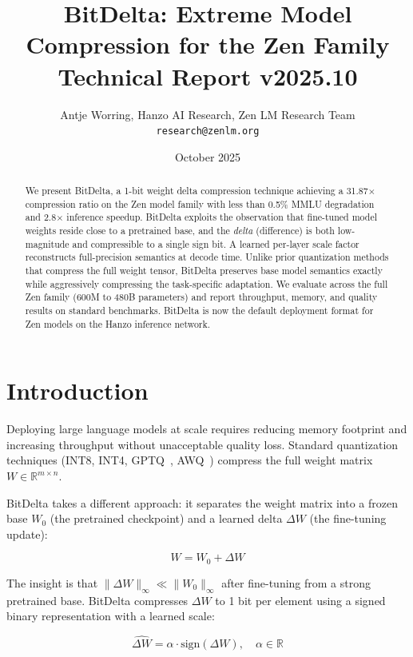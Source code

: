 \documentclass[11pt,a4paper]{article}
\title{\textbf{BitDelta: Extreme Model Compression for the Zen Family}\\
\large Technical Report v2025.10}
\author{Antje Worring, Hanzo AI Research, Zen LM Research Team\\
\texttt{research@zenlm.org}}
\date{October 2025}
\begin{document}
\maketitle

\begin{abstract}
We present BitDelta, a 1-bit weight delta compression technique achieving a 31.87$\times$
compression ratio on the Zen model family with less than 0.5\% MMLU degradation and
2.8$\times$ inference speedup. BitDelta exploits the observation that fine-tuned model
weights reside close to a pretrained base, and the \emph{delta} (difference) is both
low-magnitude and compressible to a single sign bit. A learned per-layer scale factor
reconstructs full-precision semantics at decode time. Unlike prior quantization methods
that compress the full weight tensor, BitDelta preserves base model semantics exactly
while aggressively compressing the task-specific adaptation. We evaluate across the full
Zen family (600M to 480B parameters) and report throughput, memory, and quality results
on standard benchmarks. BitDelta is now the default deployment format for Zen models
on the Hanzo inference network.
\end{abstract}

\section{Introduction}

Deploying large language models at scale requires reducing memory footprint and
increasing throughput without unacceptable quality loss. Standard quantization
techniques (INT8, INT4, GPTQ~\cite{frantar2022gptq}, AWQ~\cite{lin2023awq})
compress the full weight matrix $W \in \mathbb{R}^{m \times n}$.

BitDelta takes a different approach: it separates the weight matrix into a frozen
base $W_0$ (the pretrained checkpoint) and a learned delta $\Delta W$ (the
fine-tuning update):

\begin{equation}
W = W_0 + \Delta W
\end{equation}

The insight is that $\|\Delta W\|_\infty \ll \|W_0\|_\infty$ after fine-tuning from
a strong pretrained base. BitDelta compresses $\Delta W$ to 1 bit per element using
a signed binary representation with a learned scale:

\begin{equation}
\hat{\Delta W} = \alpha \cdot \text{sign}(\Delta W), \quad \alpha \in \mathbb{R}
\end{equation}
\end{document}
